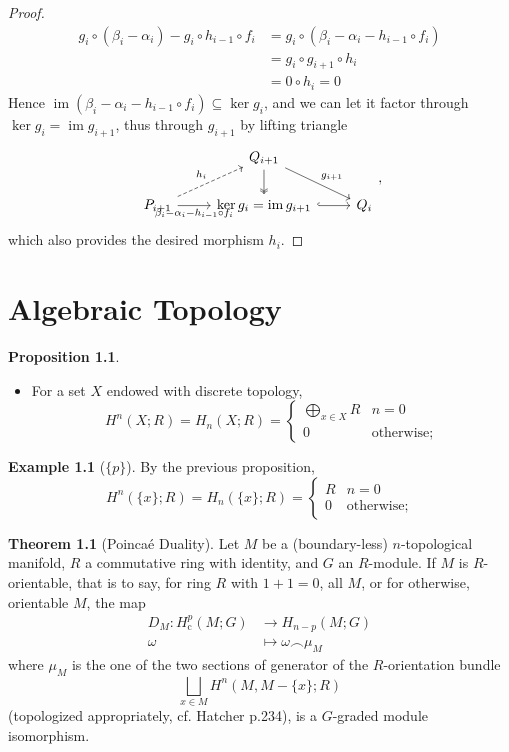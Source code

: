 \documentclass[10pt]{report}
\theoremstyle{definition}
\newtheorem{theorem}{Theorem}
\newtheorem{proposition}{Proposition}
\newtheorem{example}{Example}
\begin{document}
\begin{proof}
\begin{align*}
g_i\circ(\beta_i-\alpha_i)-g_i\circ h_{i-1}\circ f_i&=g_i\circ(\beta_i-\alpha_i-h_{i-1}\circ f_i)\\
&=g_i\circ g_{i+1}\circ h_i\\
&=0\circ h_i=0
\end{align*}
Hence $\operatorname{im}(\beta_i-\alpha_i-h_{i-1}\circ f_i)\subseteq\ker g_i$, and we can let it factor through $\ker g_i=\operatorname{im}g_{i+1}$, thus through $g_{i+1}$ by lifting triangle
$$
\begin{tikzcd}
                                                                                  & Q_{i+1} \arrow[d, two heads] \arrow[rd, "g_{i+1}"] &     \\
P_{i+1} \arrow[r, "\beta_i-\alpha_i-h_{i-1}\circ f_i"'] \arrow[ru, "h_i", dashed] & \ker g_i=\operatorname{im}g_{i+1} \arrow[r, hook]  & Q_i
\end{tikzcd},
$$
which also provides the desired morphism $h_i$.
\end{proof}

\chapter{Algebraic Topology}

\begin{proposition}\leavevmode
\begin{itemize}
\item For a set $X$ endowed with discrete topology,
$$H^n(X;R)=H_n(X;R)=\begin{cases}\bigoplus_{x\in X}R&n=0\\0& \mbox{otherwise};\end{cases}$$
\end{itemize}
\end{proposition}

\begin{example}[$\{p\}$]
By the previous proposition, $$H^n(\{x\};R)=H_n(\{x\};R)=\begin{cases}R&n=0\\0& \mbox{otherwise};\end{cases}$$
\end{example}

\begin{theorem}[Poinca\'e Duality]
Let $M$ be a (boundary-less) $n$-topological manifold, $R$ a commutative ring with identity, and $G$ an $R$-module. If $M$ is $R$-orientable, that is to say, for ring $R$ with $1+1=0$, all $M$, or for otherwise, orientable $M$, the map
\begin{align*}
D_M:H^p_\mathrm{c}(M;G)&\to H_{n-p}(M;G)\\
\omega&\mapsto\omega\frown\mu_M
\end{align*}
where $\mu_M$ is the one of the two sections of generator of the $R$-orientation bundle $$\bigsqcup_{x\in M}H^n(M,M-\{x\};R)$$ (topologized appropriately, cf. Hatcher p.234), is a $G$-graded module isomorphism.
\end{theorem}
\end{document}
